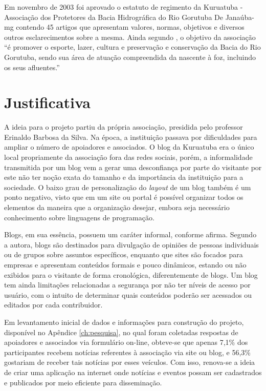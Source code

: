 Em novembro de 2003 foi aprovado o estatuto de regimento da Kuruatuba - Associação dos Protetores da Bacia Hidrográfica do Rio Gorutuba De Janaúba-mg contendo 45 artigos que apresentam valores, normas, objetivos e diversos outros esclarecimentos sobre a mesma. Ainda segundo , o objetivo da associação ``é promover o esporte, lazer, cultura e preservação e conservação da Bacia do Rio Gorutuba, sendo sua área de atuação compreendida da nascente à foz, incluindo os seus afluentes.''

\hspace{2.5cm}
\section{Justificativa}
\hspace{2.5cm}

A ideia para o projeto partiu da própria associação, presidida pelo professor Erinaldo Barbosa da Silva. Na época, a instituição passava por dificuldades para ampliar o número de apoiadores e associados. O blog da Kuruatuba era o único local propriamente da associação fora das redes sociais, porém, a informalidade transmitida por um blog vem a gerar uma desconfiança por parte do visitante por este não ter noção exata do tamanho e da importância da instituição para a sociedade. O baixo grau de personalização do \textit{layout} de um blog também é um ponto negativo, visto que em um site ou portal é possível organizar todos os elementos da maneira que a organização desejar, embora seja necessário conhecimento sobre linguagens de programação. 

Blogs, em sua essência, possuem um caráter informal, conforme  afirma. Segundo a autora, blogs são destinados para divulgação de opiniões de pessoas individuais ou de grupos sobre assuntos específicos, enquanto que sites são focados para empresas e apresentam conteúdos formais e pouco dinâmicos, estando ou não exibidos para o visitante de forma cronológica, diferentemente de blogs. Um blog tem ainda limitações relacionadas a segurança por não ter níveis de acesso por usuário, com o intuito de determinar quais conteúdos poderão ser acessados ou editados por cada contribuidor.


Em levantamento inicial de dados e informações para construção do projeto, disponível no Apêndice \ref{ch:pesquisa}, no qual foram coletadas respostas de apoiadores e associados via formulário on-line, obteve-se que apenas 7,1\% dos participantes recebem notícias referentes à associação via site ou blog, e 56,3\% gostariam de receber tais notícias por esses veículos. Com isso, renova-se a ideia de criar uma aplicação na internet onde notícias e eventos possam ser cadastrados e publicados por meio eficiente para disseminação.

